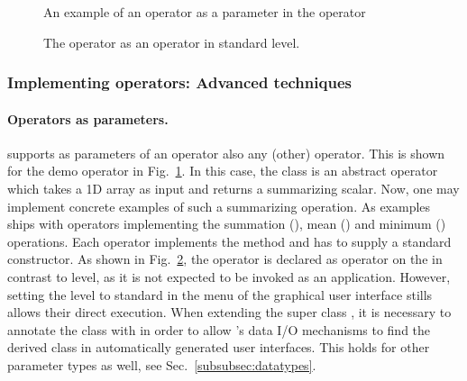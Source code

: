 \begin{figure}[tb]

\caption{\label{exa:operatorAsParameter}An example of an operator as a parameter in the operator }
\end{figure}

\begin{figure}
\vspace{4mm}

\caption{\label{exa:ALDArraySum}The operator  as an operator in standard level.}
\end{figure}

\pagebreak
\subsubsection{Implementing operators: Advanced techniques}
\label{subsubsec:implOperators-advanced}

\paragraph{Operators as parameters.}
\alida supports as parameters of an operator also any (other) \alida operator.
This is shown for the demo operator  in Fig.~\ref{exa:operatorAsParameter}.
In this case, the class  is an abstract operator 
which takes a 1D array as input and returns a summarizing scalar.
Now, one may implement concrete examples of such a summarizing operation. 
As examples \alida ships with operators implementing
the summation (), mean () and minimum
() operations.
Each operator implements the   method and has to supply a
standard constructor.
As shown in Fig.~\ref{exa:ALDArraySum},
the  operator  is declared as operator on the
 in contrast to  level, as
it is not expected to be invoked as an application.
However, setting the level to standard in the menu of the graphical user interface
stills allows their direct execution.
When extending the super class , it is necessary to
annotate the class with  in order to allow \alida's data
I/O mechanisms to find the derived class in automatically generated user
interfaces.
This holds for other parameter types as well, see Sec.~\ref{subsubsec:datatypes}.


